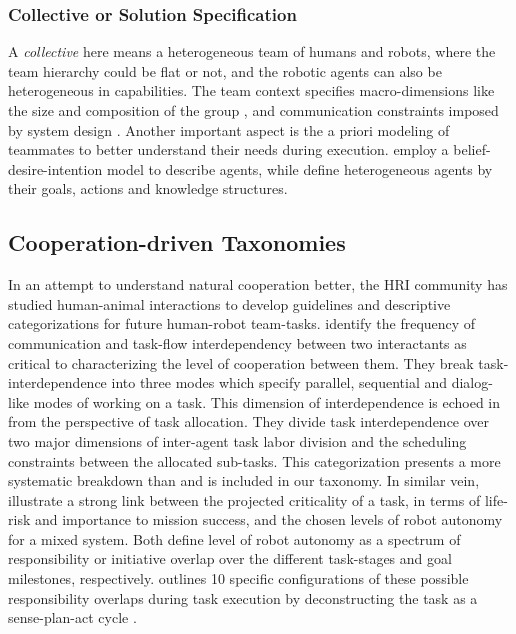 \documentclass[letterpaper, 10 pt, conference]{ieeeconf}  %
\theoremstyle{definition}
\renewcommand{\hl}[1]{{\color{red}#1}}
\begin{document}
\subsubsection{Collective or Solution Specification}

A \textit{collective} here means a heterogeneous team of humans and robots, where the team hierarchy could be flat or not, and the robotic agents can also be heterogeneous in capabilities.
The team context specifies macro-dimensions like the size and composition of the group \cite{Beer2017}, and communication constraints imposed by system design \cite{Dudek2002updated, cao1997cooperative}.
Another important aspect is the a priori modeling of teammates to better understand their needs during execution.
\cite{cao1997cooperative} employ a belief-desire-intention model to describe agents, while \cite{stone2000multiagent} define heterogeneous agents by their goals, actions and knowledge structures.

\subsection{Cooperation-driven Taxonomies}

In an attempt to understand natural cooperation better, the HRI community has studied human-animal interactions to develop guidelines and descriptive categorizations for future human-robot team-tasks.
\cite{Phillips2015} identify the frequency of communication and task-flow interdependency between two interactants as critical to characterizing the level of cooperation between them.
They break task-interdependence into three modes which specify parallel, sequential and dialog-like modes of working on a task.
This dimension of interdependence is echoed in \cite{GerkeyMataric2004, Korsah2013} from the perspective of task allocation.
They divide task interdependence over two major dimensions of inter-agent task labor division and the scheduling constraints between the allocated sub-tasks.
This categorization presents a more systematic breakdown than \cite{Phillips2015} and is included in our taxonomy.
In similar vein, \cite{Beer2014toward, JiangArkin2015} illustrate a strong link between the projected criticality of a task, in terms of life-risk and importance to mission success, and the chosen levels of robot autonomy for a mixed system.
Both \cite{Beer2014toward, JiangArkin2015} define level of robot autonomy as a spectrum of responsibility or initiative overlap over the different task-stages and goal milestones, respectively.
\cite{Beer2014toward} outlines 10 specific configurations of these possible responsibility overlaps during task execution by deconstructing the task as a sense-plan-act cycle \cite{murphy2000introduction}.
\end{document}
